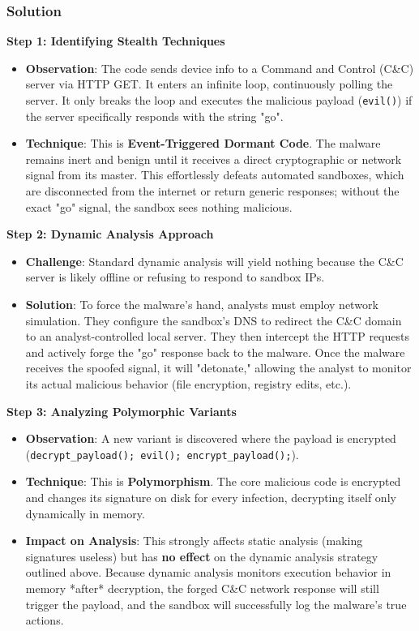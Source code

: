 \documentclass{article}
\begin{document}
\subsubsection*{Solution}
\textbf{Step 1: Identifying Stealth Techniques}
\begin{itemize}
    \item \textbf{Observation}: The code sends device info to a Command and Control (C\&C) server via HTTP GET. It enters an infinite loop, continuously polling the server. It only breaks the loop and executes the malicious payload (\texttt{evil()}) if the server specifically responds with the string "go".
    \item \textbf{Technique}: This is \textbf{Event-Triggered Dormant Code}. The malware remains inert and benign until it receives a direct cryptographic or network signal from its master. This effortlessly defeats automated sandboxes, which are disconnected from the internet or return generic responses; without the exact "go" signal, the sandbox sees nothing malicious.

\end{itemize}
\textbf{Step 2: Dynamic Analysis Approach}
\begin{itemize}
    \item \textbf{Challenge}: Standard dynamic analysis will yield nothing because the C\&C server is likely offline or refusing to respond to sandbox IPs.
    \item \textbf{Solution}: To force the malware's hand, analysts must employ network simulation. They configure the sandbox's DNS to redirect the C\&C domain to an analyst-controlled local server. They then intercept the HTTP requests and actively forge the "go" response back to the malware. Once the malware receives the spoofed signal, it will "detonate," allowing the analyst to monitor its actual malicious behavior (file encryption, registry edits, etc.).

\end{itemize}
\textbf{Step 3: Analyzing Polymorphic Variants}
\begin{itemize}
    \item \textbf{Observation}: A new variant is discovered where the payload is encrypted (\texttt{decrypt\_payload(); evil(); encrypt\_payload();}).
    \item \textbf{Technique}: This is \textbf{Polymorphism}. The core malicious code is encrypted and changes its signature on disk for every infection, decrypting itself only dynamically in memory.
    \item \textbf{Impact on Analysis}: This strongly affects static analysis (making signatures useless) but has \textbf{no effect} on the dynamic analysis strategy outlined above. Because dynamic analysis monitors execution behavior in memory *after* decryption, the forged C\&C network response will still trigger the payload, and the sandbox will successfully log the malware's true actions.
\end{itemize}
\end{document}
